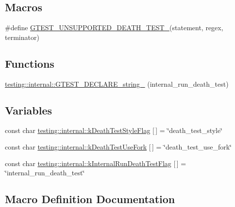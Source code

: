 \subsection*{Macros}
\begin{DoxyCompactItemize}
\item 
\#define \hyperlink{gtest-death-test-internal_8h_a29a145cda8bd2d0c6a78b0ac1d670d18}{G\+T\+E\+S\+T\+\_\+\+U\+N\+S\+U\+P\+P\+O\+R\+T\+E\+D\+\_\+\+D\+E\+A\+T\+H\+\_\+\+T\+E\+S\+T\+\_\+}(statement,  regex,  terminator)
\end{DoxyCompactItemize}
\subsection*{Functions}
\begin{DoxyCompactItemize}
\item 
\hyperlink{namespacetesting_1_1internal_ac20f635c3285878fc1195ce687f23950}{testing\+::internal\+::\+G\+T\+E\+S\+T\+\_\+\+D\+E\+C\+L\+A\+R\+E\+\_\+string\+\_\+} (internal\+\_\+run\+\_\+death\+\_\+test)
\end{DoxyCompactItemize}
\subsection*{Variables}
\begin{DoxyCompactItemize}
\item 
const char \hyperlink{namespacetesting_1_1internal_a008ebfe0c0347d65e5e06e4d310981b3}{testing\+::internal\+::k\+Death\+Test\+Style\+Flag} \mbox{[}$\,$\mbox{]} = \char`\"{}death\+\_\+test\+\_\+style\char`\"{}
\item 
const char \hyperlink{namespacetesting_1_1internal_a32051e2574562b548be3e26a52eaa553}{testing\+::internal\+::k\+Death\+Test\+Use\+Fork} \mbox{[}$\,$\mbox{]} = \char`\"{}death\+\_\+test\+\_\+use\+\_\+fork\char`\"{}
\item 
const char \hyperlink{namespacetesting_1_1internal_a8572303d929880adf30db00952e1c45d}{testing\+::internal\+::k\+Internal\+Run\+Death\+Test\+Flag} \mbox{[}$\,$\mbox{]} = \char`\"{}internal\+\_\+run\+\_\+death\+\_\+test\char`\"{}
\end{DoxyCompactItemize}


\subsection{Macro Definition Documentation}
